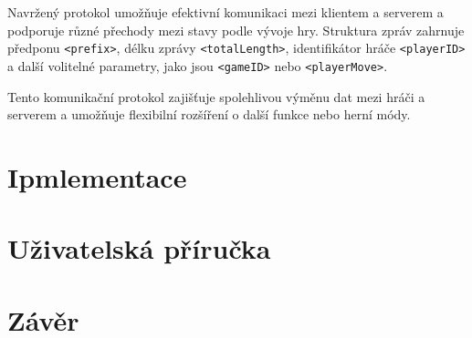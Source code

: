 \documentclass[12pt, a4paper]{article}
\begin{document}
Navržený protokol umožňuje efektivní komunikaci mezi klientem a serverem a podporuje různé přechody mezi stavy podle vývoje hry. Struktura zpráv zahrnuje předponu \texttt{<prefix>}, délku zprávy \texttt{<totalLength>}, identifikátor hráče \texttt{<playerID>} a další volitelné parametry, jako jsou \texttt{<gameID>} nebo \texttt{<playerMove>}.

Tento komunikační protokol zajišťuje spolehlivou výměnu dat mezi hráči a serverem a umožňuje flexibilní rozšíření o další funkce nebo herní módy.


\section{Ipmlementace}

\section{Uživatelská příručka}

\section{Závěr}
\end{document}
